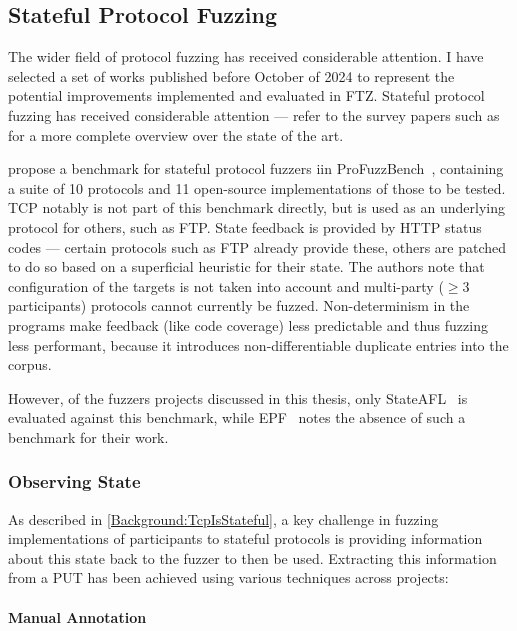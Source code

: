 \documentclass[twocolumn]{article}
\newcommand{\proj}{FTZ\xspace}
\let\savedCite=\cite
\renewcommand{\cite}{\unskip~\savedCite}
\begin{document}
\subsection{Stateful Protocol Fuzzing}
\label{RelatedWorks:ProtocolFuzzing}

The wider field of protocol fuzzing has received considerable attention. I have selected a set of works published before October of 2024 to represent the potential improvements implemented and evaluated in \proj. Stateful protocol fuzzing has received considerable attention — refer to the survey papers such as \cite{StatefulReview,Survey,IndustrialReview} for a more complete overview over the state of the art.

\citeauthor{ProFuzzBench} propose a benchmark for stateful protocol fuzzers iin ProFuzzBench\cite{ProFuzzBench}, containing a suite of 10 protocols and 11 open-source implementations of those to be tested. TCP notably is not part of this benchmark directly, but is used as an underlying protocol for others, such as FTP. State feedback is provided by HTTP status codes — certain protocols such as FTP already provide these, others are patched to do so based on a superficial heuristic for their state. The authors note that configuration of the targets is not taken into account and multi-party ($\geq 3$ participants) protocols cannot currently be fuzzed. Non-determinism in the programs make feedback (like code coverage) less predictable and thus fuzzing less performant, because it introduces non-differentiable duplicate entries into the corpus.

However, of the fuzzers projects discussed in this thesis, only StateAFL\cite{StateAFL} is evaluated against this benchmark, while EPF\cite{EPF} notes the absence of such a benchmark for their work.

\subsubsection{Observing State}

As described in \cref{Background:TcpIsStateful}, a key challenge in fuzzing implementations of participants to stateful protocols is providing information about this state back to the fuzzer to then be used. Extracting this information from a PUT has been achieved using various techniques across projects:

\paragraph{Manual Annotation}
\end{document}
